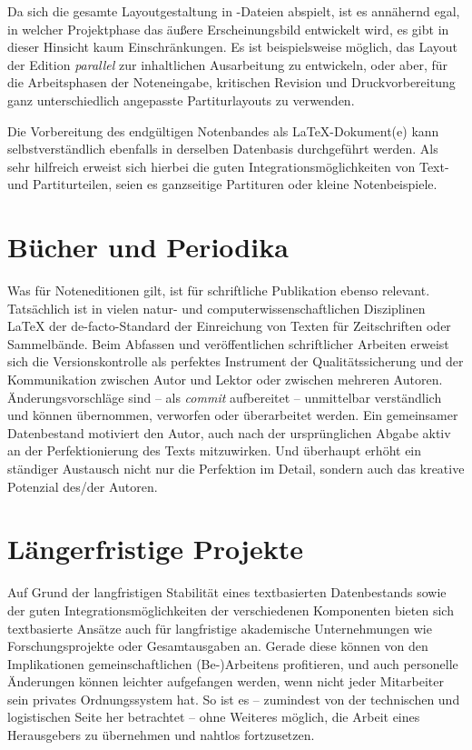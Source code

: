\documentclass[DIV=12]{scrreprt}
\begin{document}
Da sich die gesamte Layoutgestaltung in -Dateien abspielt, ist es annähernd egal, in welcher Projektphase das äußere Erscheinungsbild entwickelt wird, es gibt in dieser Hinsicht kaum Einschränkungen.
Es ist beispielsweise möglich, das Layout der Edition \emph{parallel} zur inhaltlichen Ausarbeitung zu entwickeln, oder aber, für die Arbeitsphasen der Noteneingabe, kritischen Revision und Druckvorbereitung ganz unterschiedlich angepasste Partiturlayouts zu verwenden.

Die Vorbereitung des endgültigen Notenbandes als LaTeX-Dokument(e) kann selbstverständlich ebenfalls in derselben Datenbasis durchgeführt werden.
Als sehr hilfreich erweist sich hierbei die guten Integrationsmöglichkeiten von Text- und Partiturteilen, seien es ganzseitige Partituren oder kleine Notenbeispiele.

\section{Bücher und Periodika}
\label{sec:pt_books-periodicals}
Was für Noteneditionen gilt, ist für schriftliche Publikation ebenso relevant.
Tatsächlich ist in vielen natur- und computerwissenschaftlichen Disziplinen \LaTeX{} der de-facto-Standard der Einreichung von Texten für Zeitschriften oder Sammelbände.
Beim Abfassen und veröffentlichen schriftlicher Arbeiten erweist sich die Versionskontrolle als perfektes Instrument der Qualitätssicherung und der Kommunikation zwischen Autor und Lektor oder zwischen mehreren Autoren.
Änderungsvorschläge sind -- als \emph{commit} aufbereitet -- unmittelbar verständlich und können übernommen, verworfen oder überarbeitet werden.
Ein gemeinsamer Datenbestand motiviert den Autor, auch nach der ursprünglichen Abgabe aktiv an der Perfektionierung des Texts mitzuwirken.
Und überhaupt erhöht ein ständiger Austausch nicht nur die Perfektion im Detail, sondern auch das kreative Potenzial des/der Autoren.

\section{Längerfristige Projekte}
\label{sec:pt_longrunning-projects}
Auf Grund der langfristigen Stabilität eines textbasierten Datenbestands sowie der guten Integrationsmöglichkeiten der verschiedenen Komponenten bieten sich textbasierte Ansätze auch für langfristige akademische Unternehmungen wie Forschungsprojekte oder Gesamtausgaben an.
Gerade diese können von den Implikationen gemeinschaftlichen (Be-)Arbeitens profitieren, und auch personelle Änderungen können leichter aufgefangen werden, wenn nicht jeder Mitarbeiter sein privates Ordnungssystem hat.
So ist es -- zumindest von der technischen und logistischen Seite her betrachtet -- ohne Weiteres möglich, die Arbeit eines Herausgebers zu übernehmen und nahtlos fortzusetzen.
\end{document}
